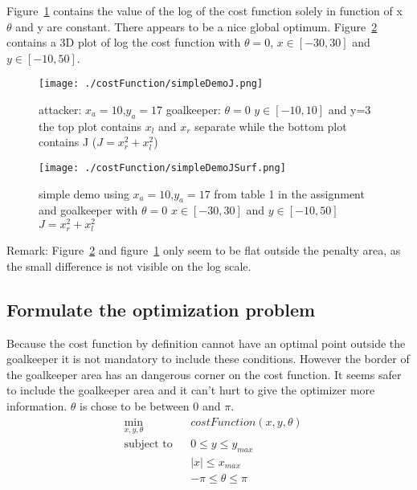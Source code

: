 Figure~\ref{fig:simple demo J} contains the value of the log of the cost function solely in function of x $\theta$ and y are constant. There appears to be a nice global optimum. Figure~\ref{fig:simple demo J surf} contains a 3D plot of log the cost function with $\theta=0$, $x \in [-30,30]$ and $y \in [-10,50]$.

\begin{figure}[H]
	\centering
	\texttt{[image: ./costFunction/simpleDemoJ.png]}
	\caption{ attacker: $x_a = 10$,$y_a=17$ goalkeeper: $\theta=0$ $y \in[-10,10]$ and y=3 the top plot contains $x_l$ and $x_r$ separate while the bottom plot contains J ($J=x_r^2+x_l^2$)}
	\label{fig:simple demo J}
\end{figure}

\begin{figure}[H]
	\centering
	\texttt{[image: ./costFunction/simpleDemoJSurf.png]}
	\caption{simple demo using $x_a = 10$,$y_a=17$ from table 1 in the assignment and goalkeeper with $\theta=0$ $x \in [-30,30]$ and  $y \in [-10,50]$ $J=x_r^2+x_l^2$}
	\label{fig:simple demo J surf}
\end{figure}

Remark: Figure~\ref{fig:simple demo J surf} and figure~\ref{fig:simple demo J} only seem to be flat outside the penalty area, as the small difference is not visible on the log scale.

\subsection{Formulate the optimization problem}
Because the cost function by definition cannot have an optimal point outside the goalkeeper it is not mandatory to include these conditions. However the border of the goalkeeper area has an dangerous corner on the cost function. It seems safer to include the goalkeeper area and it can't hurt to give the optimizer more information. $\theta$ is chose to be between 0 and $\pi$. 
\begin{equation}
	\begin{aligned}
	& \min_{x,y,\theta}
	& & costFunction(x,y,\theta)\\
	& \text{subject to}
	& & 0 \leq y \leq y_{max}\\
	&&& |x| \leq x_{max} \\
	&&& -\pi \leq \theta \leq \pi \\
	\end{aligned}
	\label{eq:goalkeeper optimization formulation}
\end{equation}